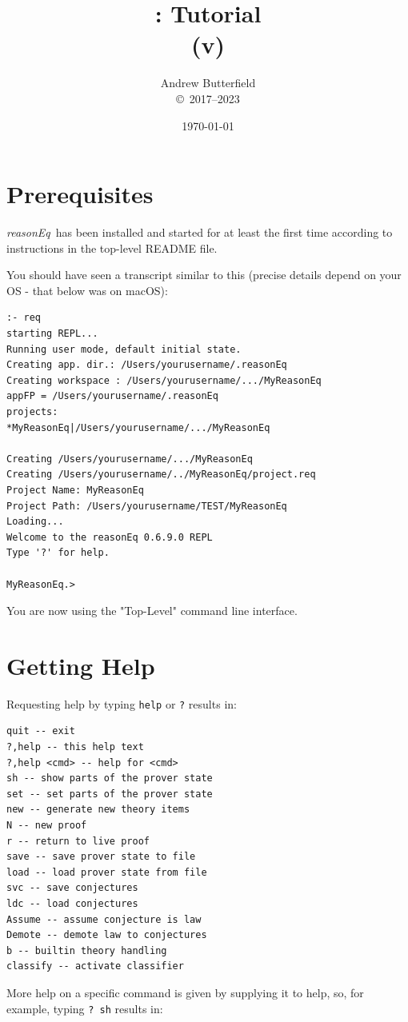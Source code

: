 \documentclass[11pt]{article}
\author{
Andrew Butterfield
\\
{\small \copyright\ 2017--2023}
}
\title{
  \reasonEq: Tutorial
  \\(v\reqVersion)
}
\date{
\today
}
\def\reasonEq{\textit{\textsf{reasonEq}}}
\begin{document}
\maketitle
\tableofcontents


\section{Prerequisites}

\reasonEq\ has been installed and started for at least the first time according to instructions in the top-level README file.

You should have seen a transcript similar to this (precise details depend on your OS - that below was on macOS):

\begin{verbatim}
:- req
starting REPL...
Running user mode, default initial state.
Creating app. dir.: /Users/yourusername/.reasonEq
Creating workspace : /Users/yourusername/.../MyReasonEq
appFP = /Users/yourusername/.reasonEq
projects:
*MyReasonEq|/Users/yourusername/.../MyReasonEq

Creating /Users/yourusername/.../MyReasonEq
Creating /Users/yourusername/../MyReasonEq/project.req
Project Name: MyReasonEq
Project Path: /Users/yourusername/TEST/MyReasonEq
Loading...
Welcome to the reasonEq 0.6.9.0 REPL
Type '?' for help.

MyReasonEq.> 
\end{verbatim}

You are now using the "Top-Level" command line interface.

\newpage
\section{Getting Help}

Requesting help by typing \verb"help" or \verb"?" results in:

\begin{verbatim}
quit -- exit
?,help -- this help text
?,help <cmd> -- help for <cmd>
sh -- show parts of the prover state
set -- set parts of the prover state
new -- generate new theory items
N -- new proof
r -- return to live proof
save -- save prover state to file
load -- load prover state from file
svc -- save conjectures
ldc -- load conjectures
Assume -- assume conjecture is law
Demote -- demote law to conjectures
b -- builtin theory handling
classify -- activate classifier
\end{verbatim}


More help on a specific command is given by supplying it to help,
so, for example, typing \verb"? sh" results in:
\end{document}
